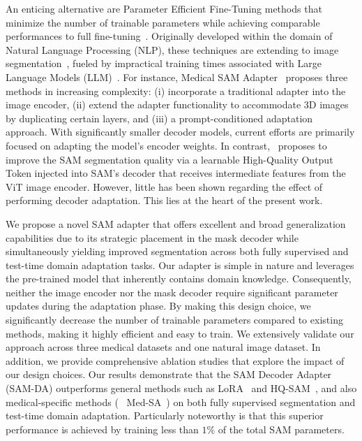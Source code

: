 An enticing alternative are Parameter Efficient Fine-Tuning methods that minimize the number of trainable parameters while achieving comparable performances to full fine-tuning~. Originally developed within the domain of Natural Language Processing (NLP), these techniques are extending to image segmentation~, fueled by impractical training times associated with Large Language Models (LLM)~. For instance, Medical SAM Adapter~ proposes three methods in increasing complexity: (i) incorporate a traditional adapter into the image encoder, (ii) extend the adapter functionality to accommodate 3D images by duplicating certain layers, and (iii) a prompt-conditioned adaptation approach. With significantly smaller decoder models, current efforts are primarily focused on adapting the model's encoder weights. In contrast,~ proposes to improve the SAM segmentation quality via a learnable High-Quality Output Token injected into SAM's decoder that receives intermediate features from the ViT image encoder. However, little has been shown regarding the effect of performing decoder adaptation. This lies at the heart of the present work. 

We propose a novel SAM adapter that offers excellent and broad generalization capabilities due to its strategic placement in the mask decoder while simultaneously yielding improved segmentation across both fully supervised and test-time domain adaptation tasks. Our adapter is simple in nature and leverages the pre-trained model that inherently contains domain knowledge.
Consequently, neither the image encoder nor the mask decoder require significant parameter updates during the adaptation phase. By making this design choice, we significantly decrease the number of trainable parameters compared to existing methods, making it highly efficient and easy to train. We extensively validate our approach across three medical datasets and one natural image dataset. In addition, we provide comprehensive ablation studies that explore the impact of our design choices. Our results demonstrate that the SAM Decoder Adapter (SAM-DA) outperforms general methods such as LoRA~ and HQ-SAM~, and also medical-specific methods (\eg~ Med-SA~) on both fully supervised segmentation and test-time domain adaptation. Particularly noteworthy is that this superior performance is achieved by training less than $1\%$ of the total SAM parameters.
